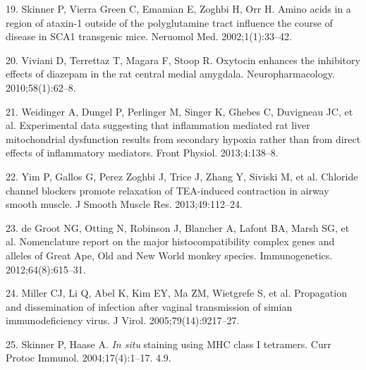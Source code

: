 \documentclass{article}
\begin{document}
\begin{hangpars}
19. Skinner P, Vierra Green C, Emamian E, Zoghbi H, Orr H. Amino acids in a region of ataxin-1 outside of the polyglutamine tract influence the course of disease in SCA1 transgenic mice. Neruomol Med. 2002;1(1):33–42.

20. Viviani D, Terrettaz T, Magara F, Stoop R. Oxytocin enhances the inhibitory effects of diazepam in the rat central medial amygdala. Neuropharmacology. 2010;58(1):62–8.

21. Weidinger A, Dungel P, Perlinger M, Singer K, Ghebes C, Duvigneau JC, et al. Experimental data suggesting that inflammation mediated rat liver mitochondrial dysfunction results from secondary hypoxia rather than from direct effects of inflammatory mediators. Front Physiol. 2013;4:138–8.

22. Yim P, Gallos G, Perez Zoghbi J, Trice J, Zhang Y, Siviski M, et al. Chloride channel blockers promote relaxation of TEA-induced contraction in airway smooth muscle. J Smooth Muscle Res. 2013;49:112–24.

23. de Groot NG, Otting N, Robinson J, Blancher A, Lafont BA, Marsh SG, et al. Nomenclature report on the major histocompatibility complex genes and alleles of Great Ape, Old and New World monkey species. Immunogenetics. 2012;64(8):615–31.

24. Miller CJ, Li Q, Abel K, Kim EY, Ma ZM, Wietgrefe S, et al. Propagation and dissemination of infection after vaginal transmission of simian immunodeficiency virus. J Virol. 2005;79(14):9217–27.

25. Skinner P, Haase A. \textit{In situ} staining using MHC class I tetramers. Curr Protoc Immunol. 2004;17(4):1–17. 4.9.
\end{hangpars}
\end{document}
